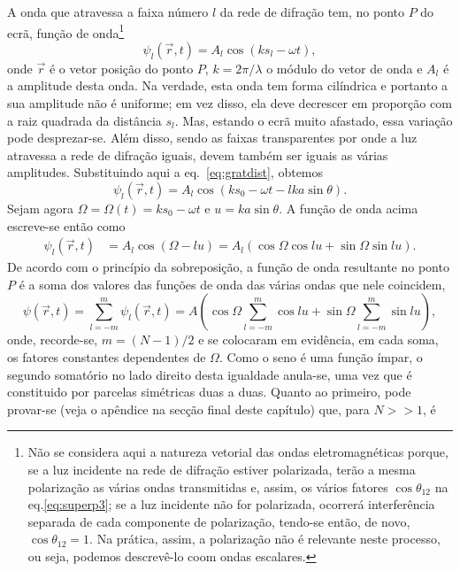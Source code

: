 A onda que atravessa a faixa número $l$ da rede de difração tem, no ponto $P$
do ecrã, função de onda\footnote{Não se considera aqui a natureza vetorial das
  ondas eletromagnéticas porque, se a luz incidente na rede de difração estiver
  polarizada, terão a mesma polarização as várias ondas transmitidas e, assim,
  os vários fatores $\cos\theta_{12}$ na eq.\eqref{eq:superp3}; se a luz
  incidente não for polarizada, ocorrerá interferência separada de cada
  componente de polarização, tendo-se então, de novo, $\cos\theta_{12}=1$. Na
  prática, assim, a polarização não é relevante neste processo, ou seja, podemos
  descrevê-lo coom ondas escalares.}
\begin{equation*}
\psi_l(\vec r,t)=A_l\cos\left(ks_l-\omega t\right),
\end{equation*}
onde $\vec r$ é o vetor posição do ponto $P$, $k=2\pi/\lambda$ o módulo do vetor
de onda e $A_l$ é a amplitude desta onda. Na verdade, esta onda tem forma
cilíndrica e portanto a sua amplitude não é uniforme; em vez disso, ela deve
decrescer em proporção com a raiz quadrada da distância $s_l$. Mas, estando o
ecrã muito afastado, essa variação pode desprezar-se. Além disso, sendo as
faixas transparentes por onde a luz atravessa a rede de difração iguais, devem
também ser iguais as várias amplitudes.  Substituindo aqui a
eq.~\eqref{eq:gratdist}, obtemos
\begin{equation*}
\psi_l(\vec r,t)=A_l\cos\left(ks_0-\omega t-lka\sin\theta\right).
\end{equation*}
Sejam agora $\Omega=\Omega(t)=ks_0-\omega t$ e $u=ka\sin\theta$. A função de
onda acima escreve-se então como
\begin{align*}
\psi_l(\vec r,t)&=A_l\cos(\Omega-lu)=A_l(\cos\Omega\cos lu+\sin\Omega\sin lu).
\end{align*}
De acordo com o princípio da sobreposição, a função de onda resultante no ponto
$P$ é a soma dos valores das funções de onda das várias ondas que nele
coincidem,
\begin{equation}\label{eq:gratpsi}
\psi(\vec r,t)=\sum_{l=-m}^m\psi_l(\vec r,t)= A\left(
  \cos\Omega\sum_{l=-m}^m\cos lu+ \sin\Omega\sum_{l=-m}^m\sin lu\right),
\end{equation}
onde, recorde-se, $m=(N-1)/2$ e se colocaram em evidência, em cada soma, os
fatores constantes dependentes de $\Omega$. Como o seno é uma função ímpar, o
segundo somatório no lado direito desta igualdade anula-se, uma vez que é
constituido por parcelas simétricas duas a duas.  Quanto ao primeiro, pode
provar-se (veja o apêndice na secção final deste capítulo) que, para $N>>1$, é
